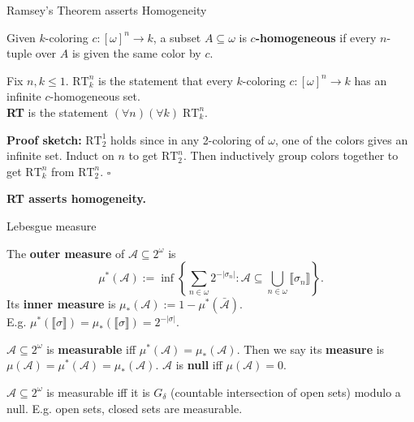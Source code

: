 \begin{frame}{Ramsey's Theorem asserts Homogeneity}
  \begin{define*}[$c$-homogeneous]
    Given $k$-coloring $c:[\omega]^n\rightarrow k$, a subset
    $A\subseteq\omega$ is \textbf{$c$-homogeneous} if every $n$-tuple over
    $A$ is given the same color by $c$.
  \end{define*}

  \vspace{0.5em}
  \begin{thm*}[Ramsey's]
    Fix $n,k\leq1$. \textbf{$\text{RT}_k^n$} is the statement that every
    $k$-coloring $c:[\omega]^n\rightarrow k$ has an infinite
    $c$-homogeneous set.\\
    \vspace{0.5em}
    \textbf{RT} is the statement $(\forall n)(\forall k)\; \text{RT}_k^n$.
  \end{thm*}
  \textbf{Proof sketch:} $\text{RT}_2^1$ holds since in any 2-coloring of
  $\omega$, one of the colors gives an infinite set. Induct on $n$ to get
  $\text{RT}_2^n$. Then inductively group colors together to get
  $\text{RT}_k^n$ from $\text{RT}_2^n$. $\square$

  \vspace{0.5em}
  \textbf{RT asserts homogeneity.}
\end{frame}

\begin{frame}{Lebesgue measure}
  \begin{define*}
    The \textbf{outer measure} of $\mathcal{A}\subseteq2^\omega$ is
    \[\mu^*(\mathcal{A}):= \inf\left\{\sum_{n\in\omega} 2^{-|\sigma_n|}:
    \mathcal{A}\subseteq \bigcup_{n\in\omega}
    \llbracket\sigma_n\rrbracket\right\}.\]
    Its \textbf{inner measure} is $\mu_*(\mathcal{A}):=
    1-\mu^*(\bar{\mathcal{A}})$.\\
    E.g. $\mu^*(\llbracket\sigma\rrbracket)
    =\mu_*(\llbracket\sigma\rrbracket) =2^{-|\sigma|}$.
  \end{define*}

  \begin{define*}
    $\mathcal{A}\subseteq2^\omega$ is \textbf{measurable} iff
    $\mu^*(\mathcal{A}) =\mu_*(\mathcal{A})$.  Then we say its
    \textbf{measure} is $\mu(\mathcal{A}) =\mu^*(\mathcal{A})
    =\mu_*(\mathcal{A})$. $\mathcal{A}$ is \textbf{null} iff
    $\mu(\mathcal{A})=0$.
  \end{define*}
  \begin{fact*}[Measurable]
    $\mathcal{A}\subseteq2^\omega$ is measurable iff it is
    $G_\delta$ (countable intersection of open sets) modulo a null. E.g.
    open sets, closed sets are measurable.
  \end{fact*}
\end{frame}

